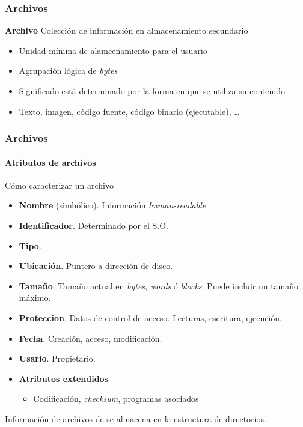 \documentclass[letter]{beamer}
\begin{document}
\begin{frame}
  \frametitle{Archivos}
  
  \begin{block}{{\bf Archivo}}
    Colección de información en almacenamiento secundario  
  \end{block}
  \begin{itemize}
    \item<2->{Unidad mínima de alamcenamiento para el usuario}
    \item<3->{Agrupación lógica de {\em bytes}}
  \end{itemize}
  
  \begin{itemize}
    \item<5-> Significado está determinado por la forma en que se utiliza
          su contenido
    \item<5-> Texto, imagen, código fuente, código binario (ejecutable), \ldots
  \end{itemize}
  
\end{frame}
\begin{frame}
  \frametitle{Archivos}
  \framesubtitle{Atributos de archivos}
  
  Cómo caracterizar un archivo
  \begin{itemize}
    \item {\bf Nombre} (simbólico). Información {\em human-readable}
    \item {\bf Identificador}. Determinado por el S.O.
    \item {\bf Tipo}.
    \item {\bf Ubicación}. Puntero a dirección de disco.
    \item {\bf Tamaño}. Tamaño actual en {\em bytes}, {\em words} ó {\em blocks}. 
                  Puede incluir un tamaño máximo.
    \item {\bf Proteccion}. Datos de control de acceso. Lecturas, escritura, ejecución.
    \item {\bf Fecha}. Creación, acceso, modificación.
    \item {\bf Usario}. Propietario.
    \item {\bf Atributos extendidos}
      \begin{itemize}
        \item Codificación, {\em checksum}, programas asociados
      \end{itemize}
  \end{itemize}
  Información de archivos de se almacena en la estructura de directorios.
\end{frame}
\end{document}
